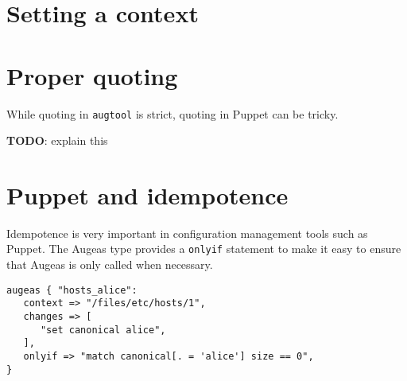 \section{Setting a context}

\section{Proper quoting}

While quoting in \verb!augtool! is strict, quoting in Puppet can be tricky.

\textbf{TODO}: explain this

\section{Puppet and idempotence}

Idempotence is very important in configuration management tools such as Puppet. The Augeas type provides a \verb!onlyif! statement to make it easy to ensure that Augeas is only called when necessary.

\begin{verbatim}
augeas { "hosts_alice":
   context => "/files/etc/hosts/1",
   changes => [
      "set canonical alice",
   ],
   onlyif => "match canonical[. = 'alice'] size == 0",
}
\end{verbatim}

\begin{quote}
\end{quote}

